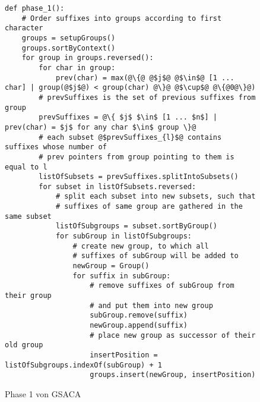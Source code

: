 \begin{figure}
\begin{verbatim}
def phase_1():
	# Order suffixes into groups according to first character
	groups = setupGroups()
	groups.sortByContext()
	for group in groups.reversed():
		for char in group:
			prev(char) = max(@\{@ @$j$@ @$\in$@ [1 ... char] | group(@$j$@) < group(char) @\}@ @$\cup$@ @\{@0@\}@)
		# prevSuffixes is the set of previous suffixes from group
		prevSuffixes = @\{ $j$ $\in$ [1 ... $n$] | prev(char) = $j$ for any char $\in$ group \}@
		# each subset @$prevSuffixes_{l}$@ contains suffixes whose number of
		# prev pointers from group pointing to them is equal to l
		listOfSubsets = prevSuffixes.splitIntoSubsets()
		for subset in listOfSubsets.reversed:
			# split each subset into new subsets, such that
			# suffixes of same group are gathered in the same subset
			listOfSubgroups = subset.sortByGroup()
			for subGroup in listOfSubgroups:
				# create new group, to which all 
				# suffixes of subGroup will be added to
				newGroup = Group()
				for suffix in subGroup:
					# remove suffixes of subGroup from their group 
					# and put them into new group
					subGroup.remove(suffix)
					newGroup.append(suffix)
					# place new group as successor of their old group
					insertPosition = listOfSubgroups.indexOf(subGroup) + 1
					groups.insert(newGroup, insertPosition)
\end{verbatim}
\caption[Phase 1 von GSACA]{Phase 1 von GSACA}
\label{saca:3:code_1}
\end{figure}